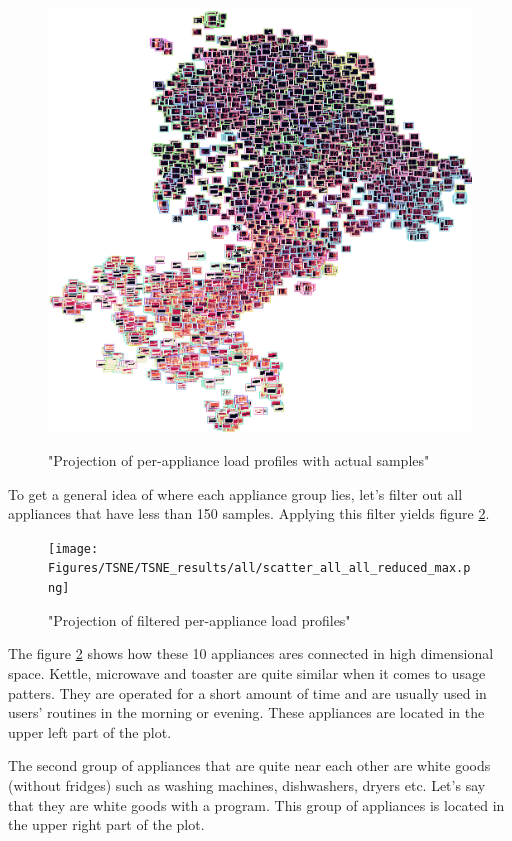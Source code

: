 \begin{figure}[H]
	\centering
	\caption{"Projection of per-appliance load profiles with actual samples"}
	\includegraphics[width=.9\textwidth]{Figures/TSNE/TSNE_results/all/img_scatter_allall_lgimgs.png}
	\label{fig:tsne_papb_img_scatter_all}
\end{figure}

To get a general idea of where each appliance group lies,
let's filter out all appliances that have less than 150 samples.
Applying this filter yields figure \ref{fig:tsne_papb_scatter_all_reduced}.

\begin{figure}[H]
	\centering
	\caption{"Projection of filtered per-appliance load profiles"}
	\texttt{[image: Figures/TSNE/TSNE\_results/all/scatter\_all\_all\_reduced\_max.png]}
	\label{fig:tsne_papb_scatter_all_reduced}
\end{figure}

The figure \ref{fig:tsne_papb_scatter_all_reduced} shows how these 10 appliances ares connected in high dimensional space.
Kettle, microwave and toaster are quite similar when it comes to usage patters.
They are operated for a short amount of time and are usually used in users' routines in the morning or evening.
These appliances are located in the upper left part of the plot.

The second group of appliances that are quite near each other are white
goods (without fridges) such as washing machines, dishwashers, dryers etc.
Let's say that they are white goods with a program. 
This group of appliances is located in the upper right part of the plot.

